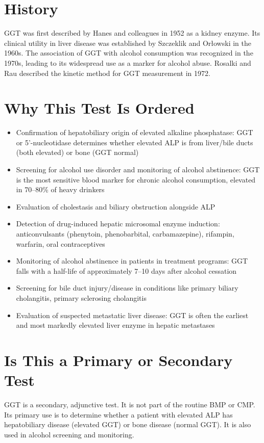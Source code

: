 \section*{History}
GGT was first described by Hanes and colleagues in 1952 as a kidney enzyme. Its clinical utility in liver disease was established by Szczeklik and Or{\l}owski in the 1960s. The association of GGT with alcohol consumption was recognized in the 1970s, leading to its widespread use as a marker for alcohol abuse. Rosalki and Rau described the kinetic method for GGT measurement in 1972.

\section*{Why This Test Is Ordered}
\begin{itemize}
  \item Confirmation of hepatobiliary origin of elevated alkaline phosphatase: GGT or 5'-nucleotidase determines whether elevated ALP is from liver/bile ducts (both elevated) or bone (GGT normal)
  \item Screening for alcohol use disorder and monitoring of alcohol abstinence: GGT is the most sensitive blood marker for chronic alcohol consumption, elevated in 70--80\% of heavy drinkers
  \item Evaluation of cholestasis and biliary obstruction alongside ALP
  \item Detection of drug-induced hepatic microsomal enzyme induction: anticonvulsants (phenytoin, phenobarbital, carbamazepine), rifampin, warfarin, oral contraceptives
  \item Monitoring of alcohol abstinence in patients in treatment programs: GGT falls with a half-life of approximately 7--10 days after alcohol cessation
  \item Screening for bile duct injury/disease in conditions like primary biliary cholangitis, primary sclerosing cholangitis
  \item Evaluation of suspected metastatic liver disease: GGT is often the earliest and most markedly elevated liver enzyme in hepatic metastases
\end{itemize}

\section*{Is This a Primary or Secondary Test}
GGT is a secondary, adjunctive test. It is not part of the routine BMP or CMP. Its primary use is to determine whether a patient with elevated ALP has hepatobiliary disease (elevated GGT) or bone disease (normal GGT). It is also used in alcohol screening and monitoring.

